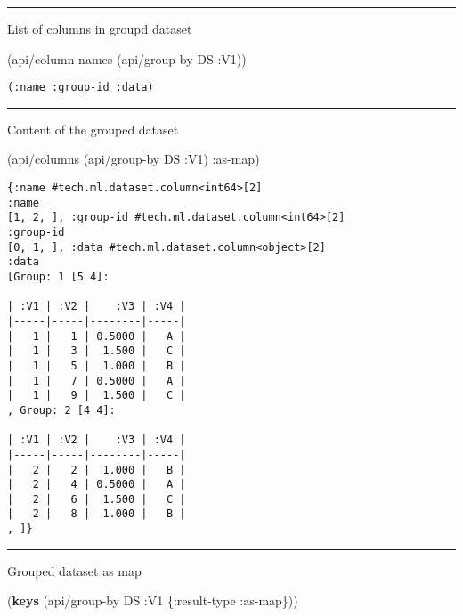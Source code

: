 \documentclass[]{article}
\newenvironment{Shaded}{\begin{snugshade}}{\end{snugshade}}
\newcommand{\KeywordTok}[1]{\textcolor[rgb]{0.13,0.29,0.53}{\textbf{#1}}}
\newcommand{\AttributeTok}[1]{\textcolor[rgb]{0.77,0.63,0.00}{#1}}
\newcommand{\NormalTok}[1]{#1}
\begin{document}
\begin{center}\rule{0.5\linewidth}{0.5pt}\end{center}

List of columns in groupd dataset

\begin{Shaded}
\begin{Highlighting}[]
\NormalTok{(api/column-names (api/group-by DS }\AttributeTok{:V1}\NormalTok{))}
\end{Highlighting}
\end{Shaded}

\begin{verbatim}
(:name :group-id :data)
\end{verbatim}

\begin{center}\rule{0.5\linewidth}{0.5pt}\end{center}

Content of the grouped dataset

\begin{Shaded}
\begin{Highlighting}[]
\NormalTok{(api/columns (api/group-by DS }\AttributeTok{:V1}\NormalTok{) }\AttributeTok{:as-map}\NormalTok{)}
\end{Highlighting}
\end{Shaded}

\begin{verbatim}
{:name #tech.ml.dataset.column<int64>[2]
:name
[1, 2, ], :group-id #tech.ml.dataset.column<int64>[2]
:group-id
[0, 1, ], :data #tech.ml.dataset.column<object>[2]
:data
[Group: 1 [5 4]:

| :V1 | :V2 |    :V3 | :V4 |
|-----|-----|--------|-----|
|   1 |   1 | 0.5000 |   A |
|   1 |   3 |  1.500 |   C |
|   1 |   5 |  1.000 |   B |
|   1 |   7 | 0.5000 |   A |
|   1 |   9 |  1.500 |   C |
, Group: 2 [4 4]:

| :V1 | :V2 |    :V3 | :V4 |
|-----|-----|--------|-----|
|   2 |   2 |  1.000 |   B |
|   2 |   4 | 0.5000 |   A |
|   2 |   6 |  1.500 |   C |
|   2 |   8 |  1.000 |   B |
, ]}
\end{verbatim}

\begin{center}\rule{0.5\linewidth}{0.5pt}\end{center}

Grouped dataset as map

\begin{Shaded}
\begin{Highlighting}[]
\NormalTok{(}\KeywordTok{keys}\NormalTok{ (api/group-by DS }\AttributeTok{:V1}\NormalTok{ \{}\AttributeTok{:result-type} \AttributeTok{:as-map}\NormalTok{\}))}
\end{Highlighting}
\end{Shaded}
\end{document}
